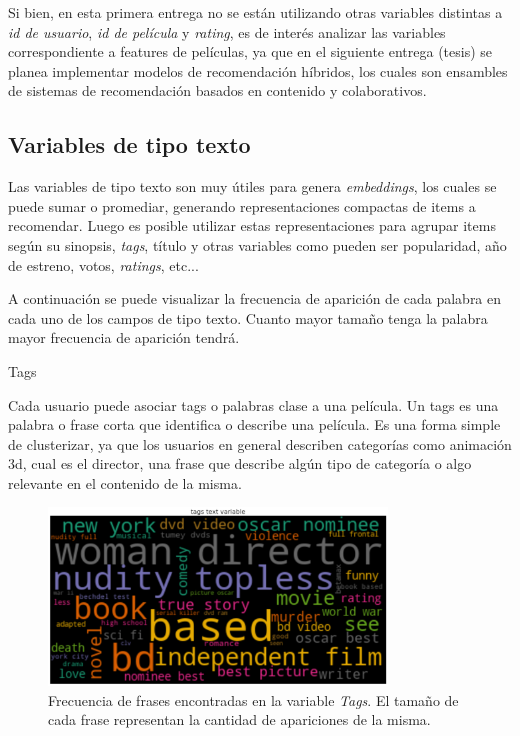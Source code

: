 \documentclass[11pt,a4paper,twoside]{thesis}
\begin{document}
Si bien, en esta primera entrega no se están utilizando otras variables distintas a \textit{id de usuario}, \textit{id de película} y \textit{rating}, es de interés analizar las variables correspondiente a features de películas, ya que en el siguiente entrega (tesis) se planea implementar modelos de recomendación híbridos, los cuales son ensambles de sistemas de recomendación basados en contenido y colaborativos.

\subsection{Variables de tipo texto}

Las variables de tipo texto son muy útiles para genera \textit{embeddings}, los cuales se puede sumar o promediar, generando representaciones compactas de items a recomendar. Luego es posible utilizar estas representaciones para agrupar items según su sinopsis, \textit{tags}, título y otras variables como pueden ser popularidad, año de estreno, votos, \textit{ratings}, etc...

A continuación se puede visualizar la frecuencia de aparición de cada palabra en cada uno de los campos de tipo texto. Cuanto mayor tamaño tenga la palabra mayor frecuencia de aparición tendrá.

\begin{description}
	\item[Tags]
\end{description}

Cada usuario puede asociar tags o palabras clase a una película. Un tags es una palabra o frase corta que identifica o describe una película. Es una forma simple de clusterizar, ya que los usuarios en general describen categorías como animación 3d, cual es el director, una frase que describe algún tipo de categoría o algo relevante en el contenido de la misma. 

\begin{figure}[h!]
	\centering
	\includegraphics[width=9cm]{./images/Cloud-tags.png}
	\caption{Frecuencia de frases encontradas en la variable \textit{Tags}. El tamaño de cada frase representan la cantidad de apariciones de la misma.}
	\label{fig:tagsCloud}
\end{figure}	
\end{document}
